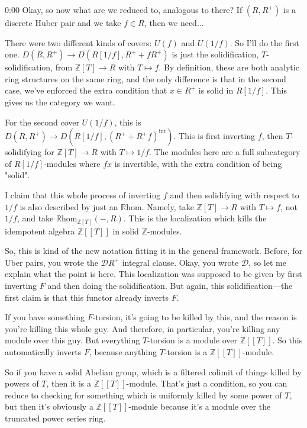 \begin{unfinished}{0:00}
Okay, so now what are we reduced to, analogous to there? If $(R, R^+)$ is a discrete Huber pair and we take $f \in R$, then we need...

There were two different kinds of covers: $U(f)$ and $U(1/f)$. So I'll do the first one. $D(R, R^+) \to D(R[1/f], R^+ + fR^+)$ is just the solidification, $T$-solidification, from $\mathbb{Z}[T] \to R$ with $T \mapsto f$. By definition, these are both analytic ring structures on the same ring, and the only difference is that in the second case, we've enforced the extra condition that $x \in R^+$ is solid in $R[1/f]$. This gives us the category we want.

For the second cover $U(1/f)$, this is $D(R, R^+) \to D(R[1/f], (R^+ + R^+f)^\mathrm{int})$. This is first inverting $f$, then $T$-solidifying for $\mathbb{Z}[T] \to R$ with $T \mapsto 1/f$. The modules here are a full subcategory of $R[1/f]$-modules where $fx$ is invertible, with the extra condition of being "solid".

I claim that this whole process of inverting $f$ and then solidifying with respect to $1/f$ is also described by just an $\mathbb{R}\mathrm{hom}$. Namely, take $\mathbb{Z}[T] \to R$ with $T \mapsto f$, not $1/f$, and take $\mathbb{R}\mathrm{hom}_{\mathbb{Z}[T]}(-, R)$. This is the localization which kills the idempotent algebra $\mathbb{Z}[[T]]$ in solid $\mathbb{Z}$-modules.

So, this is kind of the new notation fitting it in the general framework. Before, for Uber pairs, you wrote the $\mathcal{D}R^+$ integral clause. Okay, you wrote $\mathcal{D}$, so let me explain what the point is here. This localization was supposed to be given by first inverting $F$ and then doing the solidification. But again, this solidification---the first claim is that this functor already inverts $F$. 

If you have something $F$-torsion, it's going to be killed by this, and the reason is you're killing this whole guy. And therefore, in particular, you're killing any module over this guy. But everything $T$-torsion is a module over $\mathbb{Z}[[T]]$. So this automatically inverts $F$, because anything $T$-torsion is a $\mathbb{Z}[[T]]$-module. 

So if you have a solid Abelian group, which is a filtered colimit of things killed by powers of $T$, then it is a $\mathbb{Z}[[T]]$-module. That's just a condition, so you can reduce to checking for something which is uniformly killed by some power of $T$, but then it's obviously a $\mathbb{Z}[[T]]$-module because it's a module over the truncated power series ring.


\end{unfinished}
